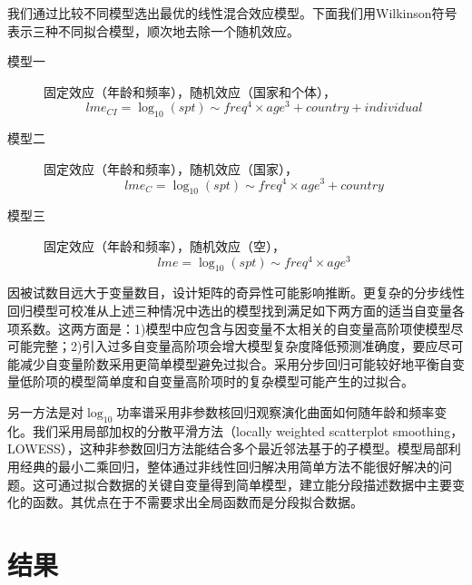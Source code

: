 我们通过比较不同模型选出最优的线性混合效应模型。下面我们用Wilkinson符号表示三种不同拟合模型，顺次地去除一个随机效应。
\begin{description}
	\item[模型一] 固定效应（年龄和频率），随机效应（国家和个体），
	\begin{equation}
	lme_{CI}=\log_{10}(spt)\sim{freq^4\times{age^3}+country+individual}
	\end{equation}
	\item[模型二] 固定效应（年龄和频率），随机效应（国家），
	\begin{equation}
	lme_{C}=\log_{10}(spt)\sim{freq^4\times{age^3}+country}
	\end{equation}
	\item[模型三] 固定效应（年龄和频率），随机效应（空），
	\begin{equation}
	lme=\log_{10}(spt)\sim{freq^4\times{age^3}}
	\end{equation}
\end{description}

因被试数目远大于变量数目，设计矩阵的奇异性可能影响推断。更复杂的分步线性回归模型可校准从上述三种情况中选出的模型找到满足如下两方面的适当自变量各项系数。这两方面是：1)模型中应包含与因变量不太相关的自变量高阶项使模型尽可能完整；2)引入过多自变量高阶项会增大模型复杂度降低预测准确度，要应尽可能减少自变量阶数采用更简单模型避免过拟合。采用分步回归可能较好地平衡自变量低阶项的模型简单度和自变量高阶项时的复杂模型可能产生的过拟合。

另一方法是对$\log_{10}$功率谱采用非参数核回归观察演化曲面如何随年龄和频率变化。我们采用局部加权的分散平滑方法（locally weighted scatterplot smoothing，LOWESS），这种非参数回归方法能结合多个最近邻法基于的子模型。模型局部利用经典的最小二乘回归，整体通过非线性回归解决用简单方法不能很好解决的问题。这可通过拟合数据的关键自变量得到简单模型，建立能分段描述数据中主要变化的函数。其优点在于不需要求出全局函数而是分段拟合数据。

\section{结果}
